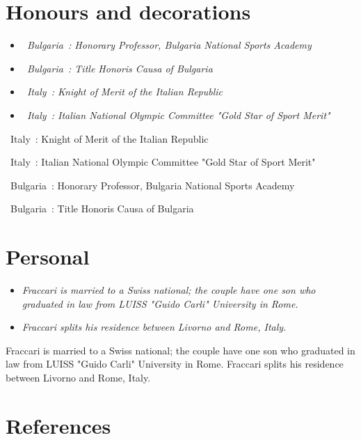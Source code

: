 \section{Honours and decorations}\label{honours-and-decorations}

\begin{itemize}
\item
  \emph{~Bulgaria~: Honorary Professor, Bulgaria National Sports
  Academy}
\item
  \emph{~Bulgaria~: Title Honoris Causa of Bulgaria}
\item
  \emph{~Italy~: Knight of Merit of the Italian Republic}
\item
  \emph{~Italy~: Italian National Olympic Committee "Gold Star of Sport
  Merit"}
\end{itemize}

~Italy~: Knight of Merit of the Italian Republic

~Italy~: Italian National Olympic Committee "Gold Star of Sport Merit"

~Bulgaria~: Honorary Professor, Bulgaria National Sports Academy

~Bulgaria~: Title Honoris Causa of Bulgaria

\section{Personal}\label{personal}

\begin{itemize}
\item
  \emph{Fraccari is married to a Swiss national; the couple have one son
  who graduated in law from LUISS "Guido Carli" University in Rome.}
\item
  \emph{Fraccari splits his residence between Livorno and Rome, Italy.}
\end{itemize}

Fraccari is married to a Swiss national; the couple have one son who
graduated in law from LUISS "Guido Carli" University in Rome. Fraccari
splits his residence between Livorno and Rome, Italy.

\section{References}\label{references}
